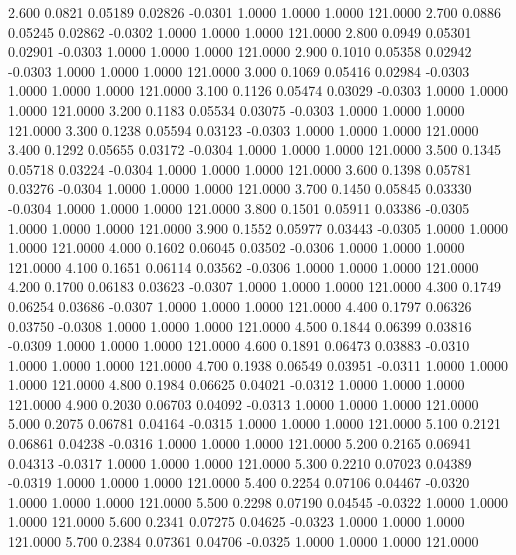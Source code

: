    2.600   0.0821   0.05189   0.02826  -0.0301   1.0000   1.0000   1.0000 121.0000
   2.700   0.0886   0.05245   0.02862  -0.0302   1.0000   1.0000   1.0000 121.0000
   2.800   0.0949   0.05301   0.02901  -0.0303   1.0000   1.0000   1.0000 121.0000
   2.900   0.1010   0.05358   0.02942  -0.0303   1.0000   1.0000   1.0000 121.0000
   3.000   0.1069   0.05416   0.02984  -0.0303   1.0000   1.0000   1.0000 121.0000
   3.100   0.1126   0.05474   0.03029  -0.0303   1.0000   1.0000   1.0000 121.0000
   3.200   0.1183   0.05534   0.03075  -0.0303   1.0000   1.0000   1.0000 121.0000
   3.300   0.1238   0.05594   0.03123  -0.0303   1.0000   1.0000   1.0000 121.0000
   3.400   0.1292   0.05655   0.03172  -0.0304   1.0000   1.0000   1.0000 121.0000
   3.500   0.1345   0.05718   0.03224  -0.0304   1.0000   1.0000   1.0000 121.0000
   3.600   0.1398   0.05781   0.03276  -0.0304   1.0000   1.0000   1.0000 121.0000
   3.700   0.1450   0.05845   0.03330  -0.0304   1.0000   1.0000   1.0000 121.0000
   3.800   0.1501   0.05911   0.03386  -0.0305   1.0000   1.0000   1.0000 121.0000
   3.900   0.1552   0.05977   0.03443  -0.0305   1.0000   1.0000   1.0000 121.0000
   4.000   0.1602   0.06045   0.03502  -0.0306   1.0000   1.0000   1.0000 121.0000
   4.100   0.1651   0.06114   0.03562  -0.0306   1.0000   1.0000   1.0000 121.0000
   4.200   0.1700   0.06183   0.03623  -0.0307   1.0000   1.0000   1.0000 121.0000
   4.300   0.1749   0.06254   0.03686  -0.0307   1.0000   1.0000   1.0000 121.0000
   4.400   0.1797   0.06326   0.03750  -0.0308   1.0000   1.0000   1.0000 121.0000
   4.500   0.1844   0.06399   0.03816  -0.0309   1.0000   1.0000   1.0000 121.0000
   4.600   0.1891   0.06473   0.03883  -0.0310   1.0000   1.0000   1.0000 121.0000
   4.700   0.1938   0.06549   0.03951  -0.0311   1.0000   1.0000   1.0000 121.0000
   4.800   0.1984   0.06625   0.04021  -0.0312   1.0000   1.0000   1.0000 121.0000
   4.900   0.2030   0.06703   0.04092  -0.0313   1.0000   1.0000   1.0000 121.0000
   5.000   0.2075   0.06781   0.04164  -0.0315   1.0000   1.0000   1.0000 121.0000
   5.100   0.2121   0.06861   0.04238  -0.0316   1.0000   1.0000   1.0000 121.0000
   5.200   0.2165   0.06941   0.04313  -0.0317   1.0000   1.0000   1.0000 121.0000
   5.300   0.2210   0.07023   0.04389  -0.0319   1.0000   1.0000   1.0000 121.0000
   5.400   0.2254   0.07106   0.04467  -0.0320   1.0000   1.0000   1.0000 121.0000
   5.500   0.2298   0.07190   0.04545  -0.0322   1.0000   1.0000   1.0000 121.0000
   5.600   0.2341   0.07275   0.04625  -0.0323   1.0000   1.0000   1.0000 121.0000
   5.700   0.2384   0.07361   0.04706  -0.0325   1.0000   1.0000   1.0000 121.0000
